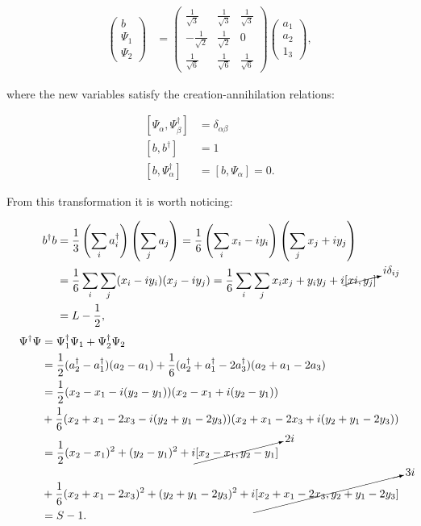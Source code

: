 \begin{align*}
\begin{pmatrix} b \\ \Psi_1 \\ \Psi_2 \end{pmatrix} &= 
\begin{pmatrix}\frac{1}{\sqrt{3}} &\frac{1}{\sqrt{3}}&\frac{1}{\sqrt{3}}\\
				-\frac{1}{\sqrt{2}}&\frac{1}{\sqrt{2}}&0\\
				\frac{1}{\sqrt{6}}&\frac{1}{\sqrt{6}}&\frac{1}{\sqrt{6}}\end{pmatrix} \begin{pmatrix} a_1 \\ a_2 \\ 1_3 \end{pmatrix} ,
\end{align*}

where the new variables satisfy the creation-annihilation relations:

\begin{align*}
\left[ \Psi_\alpha,\Psi_\beta^\dagger\right] &= \delta_{\alpha\beta}\\
\left[ b,b^\dagger\right] &= 1\\
\left[ b,\Psi_\alpha^\dagger\right] &=\left[ b,\Psi_\alpha\right] = 0 .
\end{align*}

From this transformation it is worth noticing:

\begin{align*}
b^\dagger b &= \frac{1}{3}\left( \sum_i a_i^\dagger \right)\left( \sum_j a_j \right) =  \frac{1}{6}\left( \sum_i x_i-iy_i \right)\left( \sum_j x_j+iy_j \right)\\
&= \frac{1}{6}\sum_i\sum_j(x_i-iy_i)(x_j-iy_j) = \frac{1}{6}\sum_i\sum_jx_ix_j+y_iy_j +i\cancelto{i\delta_{ij}}{[xi,y_j]}\\
&= L - \frac{1}{2},
\end{align*}
\small
\begin{align*}
\Psi^\dagger\Psi &= \Psi_1^\dagger\Psi_1 +\Psi_2^\dagger\Psi_2\\
&= \frac{1}{2} (a_2^\dagger-a_1^\dagger)(a_2-a_1) + \frac{1}{6}(a_2^\dagger+a_1^\dagger-2a_3^\dagger)(a_2+a_1-2a_3)\\
&= \frac{1}{2} (x_2-x_1 -i(y_2-y_1))(x_2-x_1 +i(y_2-y_1))\\
&+\frac{1}{6}(x_2+x_1-2x_3-i(y_2+y_1-2y_3))(x_2+x_1-2x_3 +i(y_2+y_1-2y_3))\\
&= \frac{1}{2} (x_2-x_1)^2+(y_2-y_1)^2+i\cancelto{2i}{[x_2-x_1,y_2-y_1]} \\
&+ \frac{1}{6} (x_2+x_1-2x_3)^2+(y_2+y_1-2y_3)^2+i\cancelto{3i}{[x_2+x_1-2x_3,y_2+y_1-2y_3]}\\
&= S-1.
\end{align*}
\normalsize

